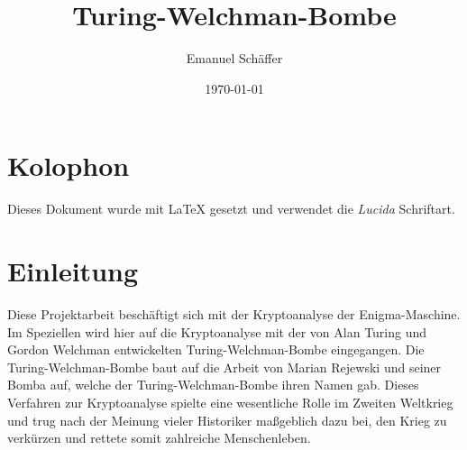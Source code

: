 \documentclass[ngerman, a4paper, footsepline, headsepline]{scrreport}
\begin{document}
	\setcounter{page}{1}
	
	\subject{Projektarbeit zur Kryptoanalyse der Enigma-Maschine durch eine Software-Nachbildung der Turing-Welchman-Bombe\\
	der Fakultät Elektrotechnik und Informatik}
	\title{Turing-Welchman-Bombe}
	\author{Emanuel Schäffer}
	\date{\today}
	\publishers{RWU--University of Applied Sciences \\ Prof. Dipl.-Math. Ekkehard Löhmann}
	\maketitle
	
	\cleardoublepage
	\chapter*{Kolophon}
	Dieses Dokument wurde mit \LaTeX{} gesetzt und verwendet die \textsl{Lucida} Schriftart.
	
	\cleardoublepage
	\tableofcontents
	
	\chapter*{Einleitung}\label{ch:einleitung}
	Diese Projektarbeit beschäftigt sich mit der Kryptoanalyse der Enigma-Maschine.
	Im Speziellen wird hier auf die Kryptoanalyse mit der von Alan Turing und Gordon Welchman entwickelten \glqq Turing-Welchman-Bombe\grqq{} eingegangen.
	Die Turing-Welchman-Bombe baut auf die Arbeit von Marian Rejewski und seiner \glqq Bomba\grqq{} auf, welche der Turing-Welchman-Bombe ihren Namen gab.
	Dieses Verfahren zur Kryptoanalyse spielte eine wesentliche Rolle im Zweiten Weltkrieg und trug nach der Meinung vieler Historiker maßgeblich dazu bei, den Krieg zu verkürzen und rettete somit zahlreiche Menschenleben.
	
	\cleardoublepage
	\setcounter{page}{1}
	
	
	
	
	
	
	
	
	
	
%	
	
	\newpage
\end{document}
